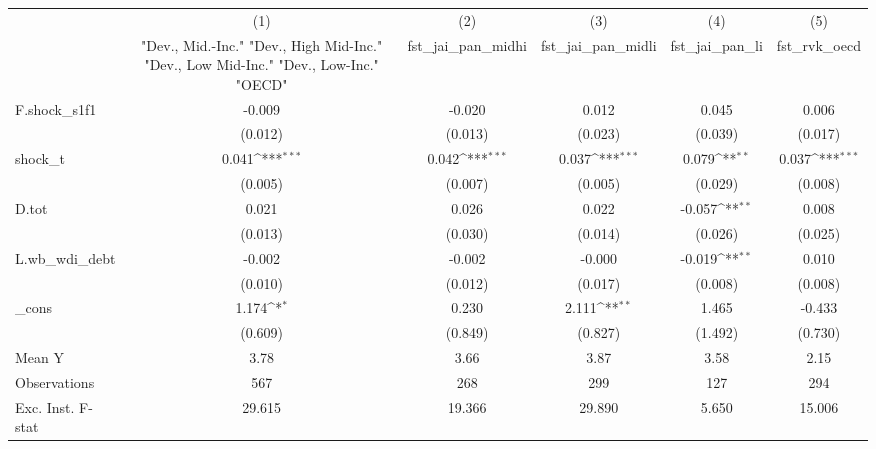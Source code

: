 {
\def\sym#1{\ifmmode^{#1}\else\(^{#1}\)\fi}
\begin{tabular}{l*{5}{c}}
\toprule
            &\multicolumn{1}{c}{(1)}&\multicolumn{1}{c}{(2)}&\multicolumn{1}{c}{(3)}&\multicolumn{1}{c}{(4)}&\multicolumn{1}{c}{(5)}\\
            &\multicolumn{1}{c}{ "Dev., Mid.-Inc." "Dev., High Mid-Inc." "Dev., Low Mid-Inc." "Dev., Low-Inc." "OECD" }&\multicolumn{1}{c}{fst\_jai\_pan\_midhi}&\multicolumn{1}{c}{fst\_jai\_pan\_midli}&\multicolumn{1}{c}{fst\_jai\_pan\_li}&\multicolumn{1}{c}{fst\_rvk\_oecd}\\
\midrule
F.shock\_s1f1&      -0.009         &      -0.020         &       0.012         &       0.045         &       0.006         \\
            &     (0.012)         &     (0.013)         &     (0.023)         &     (0.039)         &     (0.017)         \\
\addlinespace
shock\_t     &       0.041\sym{***}&       0.042\sym{***}&       0.037\sym{***}&       0.079\sym{**} &       0.037\sym{***}\\
            &     (0.005)         &     (0.007)         &     (0.005)         &     (0.029)         &     (0.008)         \\
\addlinespace
D.tot       &       0.021         &       0.026         &       0.022         &      -0.057\sym{**} &       0.008         \\
            &     (0.013)         &     (0.030)         &     (0.014)         &     (0.026)         &     (0.025)         \\
\addlinespace
L.wb\_wdi\_debt&      -0.002         &      -0.002         &      -0.000         &      -0.019\sym{**} &       0.010         \\
            &     (0.010)         &     (0.012)         &     (0.017)         &     (0.008)         &     (0.008)         \\
\addlinespace
\_cons      &       1.174\sym{*}  &       0.230         &       2.111\sym{**} &       1.465         &      -0.433         \\
            &     (0.609)         &     (0.849)         &     (0.827)         &     (1.492)         &     (0.730)         \\
\midrule
Mean Y      &        3.78         &        3.66         &        3.87         &        3.58         &        2.15         \\
Observations&         567         &         268         &         299         &         127         &         294         \\
Exc. Inst. F-stat&      29.615         &      19.366         &      29.890         &       5.650         &      15.006         \\
\bottomrule
\end{tabular}
}
